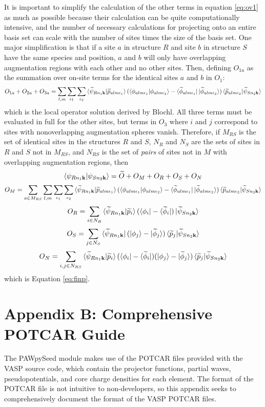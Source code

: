 \documentclass[12pt]{article}
\begin{document}
It is important to simplify the calculation of the other terms in equation \ref{eq:ov1} as much
as possible because their calculation can be quite computationally intensive, and the number of
necessary calculations for projecting onto an entire basis set can scale with the number
of sites times the size of the basis set. One major simplification is that if a site $a$ in structure
$R$ and site $b$ in structure $S$ have the same species and position, $a$ and $b$ will only have
overlapping augmentation regions with each other and no other sites. Then, defining $O_{1a}$
as the summation over on-site terms for the identical sites $a$ and $b$ in $O_1$:
$$O_{1a}+O_{2a}+O_{3a}=\sum_{l,m}\sum_{\epsilon_1}\sum_{\epsilon_2}
\braket{\widetilde{\psi}_{Rn_1\mathbf{k}}|\widetilde{p}_{alm\epsilon _1}}
(\braket{\phi_{alm\epsilon _1}|{\phi_{alm\epsilon _2}}}
-\bra{\widetilde{\phi}_{alm\epsilon _1}}\ket{\widetilde{\phi}_{alm\epsilon _2}})
\braket{\widetilde{p}_{alm\epsilon _2}|\widetilde{\psi}_{Sn_2\mathbf{k}}}$$
which is the local operator solution derived by Blochl. All three terms must
be evaluated in full for the other sites, but terms in $O_3$ where $i$ and $j$ correspond
to sites with nonoverlapping augmentation spheres vanish. Therefore, if $M_{RS}$ is the set
of identical sites in the structures $R$ and $S$, $N_R$ and $N_S$ are the sets of sites
in $R$ and $S$ not in $M_{RS}$, and $N_{RS}$ is the set of \emph{pairs} of sites not in
$M$ with overlapping augmentation regions, then
$$
\braket{\psi_{Rn_1\mathbf{k}}|\psi_{Sn_2\mathbf{k}}}=\widetilde{O}+O_M+O_R+O_S+O_N
$$
$$
O_M=\sum_{a\in M_{RS}}\sum_{l,m}\sum_{\epsilon_1}\sum_{\epsilon_2}
\braket{\widetilde{\psi}_{Rn_1\mathbf{k}}|\widetilde{p}_{alm\epsilon _1}}
(\braket{\phi_{alm\epsilon _1}|{\phi_{alm\epsilon _2}}}
-\bra{\widetilde{\phi}_{alm\epsilon _1}}\ket{\widetilde{\phi}_{alm\epsilon _2}})
\braket{\widetilde{p}_{alm\epsilon _2}|\widetilde{\psi}_{Sn_2\mathbf{k}}}
$$
$$
O_R=\sum_{i\in N_R}\braket{\widetilde{\psi}_{Rn_1\mathbf{k}}|\widetilde{p}_i}
(\bra{\phi_i}-\bra{\widetilde{\phi}_i})
\ket{\widetilde{\psi}_{Sn_2\mathbf{k}}}
$$
$$
O_S=\sum_{j\in N_S}\bra{\widetilde{\psi}_{Rn_1\mathbf{k}}}(\ket{\phi_j}-\ket{\widetilde{\phi}_j})
\braket{\widetilde{p}_j|\widetilde{\psi}_{Sn_2\mathbf{k}}}
$$
$$
O_N=\sum_{i,j\in N_{RS}}\braket{\widetilde{\psi}_{Rn_1\mathbf{k}}|
\widetilde{p}_i}(\bra{\phi_i}-\bra{\widetilde{\phi}_i})
(\ket{\phi_j}-\ket{\widetilde{\phi}_j})\braket{\widetilde{p}_j|\widetilde{\psi}_{Sn_2\mathbf{k}}}
$$
which is Equation \ref{eq:finp}.

\section*{Appendix B: Comprehensive POTCAR Guide}
The PAWpySeed module makes use of the POTCAR files provided with the VASP source code, which
contain the projector functions, partial waves, pseudopotentials, and core charge densities
for each element. The format of the POTCAR file is not intuitive to non-developers, so this
appendix seeks to comprehensively document the format of the VASP POTCAR files.
\end{document}
